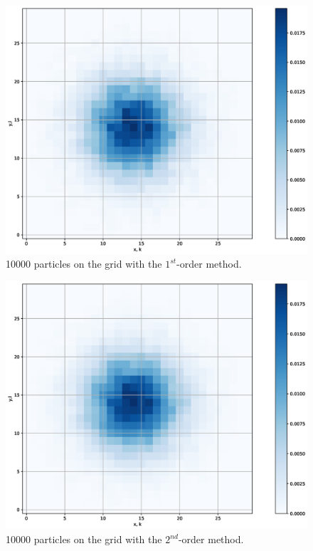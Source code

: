 \documentclass{scrartcl}
\begin{document}
\begin{figure}[h]
	\centering
	\includegraphics[width=0.9\linewidth]{Plots/N10000_1}
	\caption{10000 particles on the grid with the \(1^{st}\)-order method.}
	\label{fig:n100001}
\end{figure}
\begin{figure}[h]
	\centering
	\includegraphics[width=0.9\linewidth]{Plots/N10000_2}
	\caption{10000 particles on the grid with the \(2^{nd}\)-order method.}
	\label{fig:n100002}
\end{figure}
\end{document}
